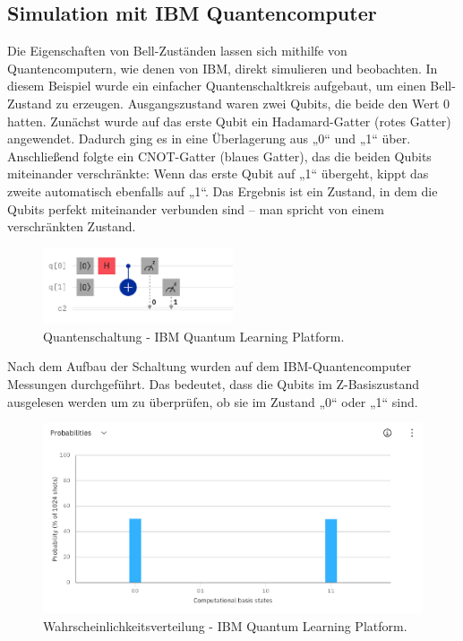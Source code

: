 \subsection{Simulation mit IBM Quantencomputer}
Die Eigenschaften von Bell-Zuständen lassen sich mithilfe von Quantencomputern, wie denen von IBM, direkt simulieren und beobachten. In diesem Beispiel wurde ein einfacher Quantenschaltkreis aufgebaut, um einen Bell-Zustand zu erzeugen. Ausgangszustand waren zwei Qubits, die beide den Wert 0 hatten. Zunächst wurde auf das erste Qubit ein Hadamard-Gatter (rotes Gatter) angewendet. Dadurch ging es in eine Überlagerung aus „0“ und „1“ über. Anschließend folgte ein CNOT-Gatter (blaues Gatter), das die beiden Qubits miteinander verschränkte: Wenn das erste Qubit auf „1“ übergeht, kippt das zweite automatisch ebenfalls auf „1“. Das Ergebnis ist ein Zustand, in dem die Qubits perfekt miteinander verbunden sind – man spricht von einem verschränkten Zustand. 

\begin{figure}[h]
    \centering
    \includegraphics[width=0.5\textwidth]{images/Schaltung_IBM.png}
    \caption{Quantenschaltung - IBM Quantum Learning Platform.}
    \label{fig:meinbild}
\end{figure}

Nach dem Aufbau der Schaltung wurden auf dem IBM-Quantencomputer Messungen durchgeführt. Das bedeutet, dass die Qubits im Z-Basiszustand ausgelesen werden um zu überprüfen, ob sie im Zustand „0“ oder „1“ sind. 

\begin{figure}[h]
    \centering
    \includegraphics[width=1\textwidth]{images/results_ibm.png}
    \caption{Wahrscheinlichkeitsverteilung - IBM Quantum Learning Platform.}
    \label{fig:meinbild}
\end{figure}



